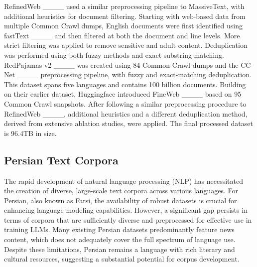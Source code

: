 RefinedWeb ____ used a similar preprocessing pipeline to MassiveText, with additional heuristics for document filtering. Starting with web-based data from multiple Common Crawl dumps, English documents were first identified using fastText ____ and then filtered at both the document and line levels. More strict filtering was applied to remove sensitive and adult content. Deduplication was performed using both fuzzy methods and exact substring matching. RedPajamas v2 ____ was created using 84 Common Crawl dumps and the CC-Net ____ preprocessing pipeline, with fuzzy and exact-matching deduplication. This dataset spans five languages and contains 100 billion documents. Building on their earlier dataset, Huggingface introduced FineWeb ____ based on 95 Common Crawl snapshots. After following a similar preprocessing procedure to RefinedWeb ____, additional heuristics and a different deduplication method, derived from extensive ablation studies, were applied. The final processed dataset is 96.4TB in size.

\subsection{Persian Text Corpora}
The rapid development of natural language processing (NLP) has necessitated the creation of diverse, large-scale text corpora across various languages. For Persian, also known as Farsi, the availability of robust datasets is crucial for enhancing language modeling capabilities. However, a significant gap persists in terms of corpora that are sufficiently diverse and preprocessed for effective use in training LLMs. Many existing Persian datasets predominantly feature news content, which does not adequately cover the full spectrum of language use. Despite these limitations, Persian remains a language with rich literary and cultural resources, suggesting a substantial potential for corpus development. 

